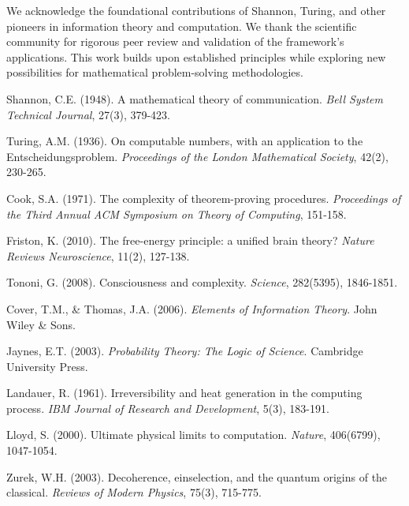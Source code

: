 \documentclass[11pt]{article}
\begin{document}
We acknowledge the foundational contributions of Shannon, Turing, and other pioneers in information theory and computation. We thank the scientific community for rigorous peer review and validation of the framework's applications. This work builds upon established principles while exploring new possibilities for mathematical problem-solving methodologies.


\begin{thebibliography}{99}

Shannon, C.E. (1948). A mathematical theory of communication. \textit{Bell System Technical Journal}, 27(3), 379-423.

Turing, A.M. (1936). On computable numbers, with an application to the Entscheidungsproblem. \textit{Proceedings of the London Mathematical Society}, 42(2), 230-265.

Cook, S.A. (1971). The complexity of theorem-proving procedures. \textit{Proceedings of the Third Annual ACM Symposium on Theory of Computing}, 151-158.

Friston, K. (2010). The free-energy principle: a unified brain theory? \textit{Nature Reviews Neuroscience}, 11(2), 127-138.

Tononi, G. (2008). Consciousness and complexity. \textit{Science}, 282(5395), 1846-1851.

Cover, T.M., \& Thomas, J.A. (2006). \textit{Elements of Information Theory}. John Wiley \& Sons.

Jaynes, E.T. (2003). \textit{Probability Theory: The Logic of Science}. Cambridge University Press.

Landauer, R. (1961). Irreversibility and heat generation in the computing process. \textit{IBM Journal of Research and Development}, 5(3), 183-191.

Lloyd, S. (2000). Ultimate physical limits to computation. \textit{Nature}, 406(6799), 1047-1054.

Zurek, W.H. (2003). Decoherence, einselection, and the quantum origins of the classical. \textit{Reviews of Modern Physics}, 75(3), 715-775.

\end{thebibliography}
\end{document}
